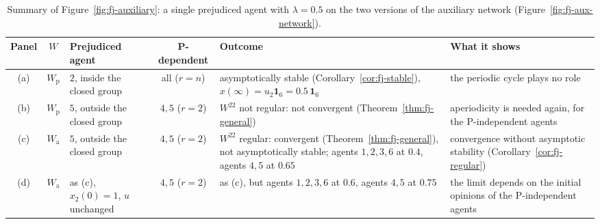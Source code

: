\begin{table}[H]
  \centering
  \small
  \renewcommand{\arraystretch}{1.2} %
  \begin{tabular}{@{}c c >{\raggedright\arraybackslash}p{2.6cm} c >{\raggedright\arraybackslash}p{4.7cm} >{\raggedright\arraybackslash}p{4.3cm}@{}}
    \toprule
    Panel & $W$ & Prejudiced agent & P-dependent & Outcome & What it shows \\
    \midrule
    (a) & $W_{\mathrm{p}}$ & $2$, inside the closed group & all ($r = n$)
        & asymptotically stable (Corollary~\ref{cor:fj-stable}),
          $x(\infty) = u_2 \mathbf{1}_6 = 0.5\, \mathbf{1}_6$
        & the periodic cycle plays no role \\
    \midrule
    (b) & $W_{\mathrm{p}}$ & $5$, outside the closed group & $4, 5$ ($r = 2$)
        & $W^{22}$ not regular: not convergent (Theorem~\ref{thm:fj-general})
        & aperiodicity is needed again, for the P-independent agents \\
    \midrule
    (c) & $W_{\mathrm{a}}$ & $5$, outside the closed group & $4, 5$ ($r = 2$)
        & $W^{22}$ regular: convergent (Theorem~\ref{thm:fj-general}), not
          asymptotically stable; agents $1,2,3,6$ at $0.4$, agents $4,5$ at $0.65$
        & convergence without asymptotic stability (Corollary~\ref{cor:fj-regular}) \\
    \midrule
    (d) & $W_{\mathrm{a}}$ & as (c), $x_2(0) = 1$, $u$ unchanged & $4, 5$ ($r = 2$)
        & as (c), but agents $1,2,3,6$ at $0.6$, agents $4,5$ at $0.75$
        & the limit depends on the initial opinions of the P-independent agents \\
    \bottomrule
  \end{tabular}
  \caption{Summary of Figure~\ref{fig:fj-auxiliary}: a single prejudiced agent with
  $\lambda = 0.5$ on the two versions of the auxiliary network
  (Figure~\ref{fig:fj-aux-network}).}
  \label{tab:fj-aux}
\end{table}


